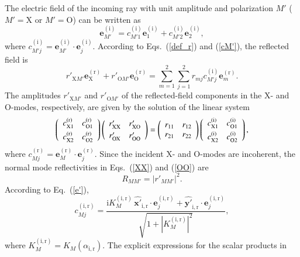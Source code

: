 \documentclass{aa}
\newcommand{\beq}{\begin{equation}}
\newcommand{\eeq}{\end{equation}}
\newcommand{\req}[1]{Eq.~(\ref{#1})}
\begin{document}
The electric field
of the incoming ray with unit amplitude and polarization
$M'$ ($M'=$X or $M'=$O) can be written as
\beq
  \bm{e}^\mathrm{(i)}_{M'} = 
     c_{M'1}^\mathrm{(i)} \bm{e}_1^\mathrm{(i)}
      + c_{M'2}^\mathrm{(i)} \bm{e}_2^\mathrm{(i)},
\label{cM'}
\eeq
where $c_{M'j}^\mathrm{(i)} = \bm{e}_{M'}^\mathrm{(i)}
\cdot \bm{e}_j^\mathrm{(i)}$.
According to Eqs.~(\ref{def_r}) and (\ref{cM'}), the
reflected field is 
\beq
   r'_{\mathrm{X}M'} \bm{e_\mathrm{X}^\mathrm{(r)}}
   + r'_{\mathrm{O}M'} \bm{e_\mathrm{O}^\mathrm{(r)}}
   =
   \sum_{m=1}^{2} \sum_{j=1}^{2} r_{mj} 
      c_{M'j}^\mathrm{(i)} \bm{e}_m^\mathrm{(r)} .
\eeq
The amplitudes $r'_{\mathrm{X}M'}$ and
 $r'_{\mathrm{O}M'}$ of the reflected-field components in
the X- and O-modes, respectively, are given by the solution
of the linear system
\beq
   \left( \begin{array}{cc}
      c_\mathrm{X1}^\mathrm{(r)}  & c_\mathrm{O1}^\mathrm{(r)}
 \\
\rule{0pt}{3ex}
      c_\mathrm{X2}^\mathrm{(r)}  & c_\mathrm{O2}^\mathrm{(r)}
    \end{array} \right)
   \left( \begin{array}{cc}
        r'_{\mathrm{XX}} & r'_{\mathrm{XO}} 
 \\
\rule{0pt}{2.5ex}
 r'_{\mathrm{OX}} & r'_{\mathrm{OO}}
    \end{array} \right)
       =
   \left( \begin{array}{cc}
      r_{11} & r_{12} \\
      r_{21} & r_{22}
    \end{array} \right)
   \left( \begin{array}{cc}
      c_\mathrm{X1}^\mathrm{(i)}  & c_\mathrm{O1}^\mathrm{(i)}
 \\
\rule{0pt}{3ex}
      c_\mathrm{X2}^\mathrm{(i)}  & c_\mathrm{O2}^\mathrm{(i)}
    \end{array} \right)
     ,
\label{r'MM'}
\eeq
where $c_{Mj}^\mathrm{(r)} = \bm{e}_{M}^\mathrm{(r)}
\cdot \bm{e}_j^\mathrm{(r)}$. Since
the incident X- and O-modes are incoherent,
the normal mode
reflectivities in Eqs.~(\ref{XX}) and (\ref{OO}) are
\beq
   R_{MM'} = | r'_{MM'} |^2.
\eeq
According to \req{e'},
\beq
   c_{Mj}^\mathrm{(i,r)} =
      \frac{\mathrm{i}K_M^\mathrm{(i,r)}
        \,\hat{\mathbf{x'}}_\mathrm{i,r}\cdot\bm{e}_j^\mathrm{(i,r)}
         + \hat{\mathbf{y'}}_\mathrm{i,r}\cdot\bm{e}_j^\mathrm{(i,r)}
         }{
         \sqrt{1+|K_M^\mathrm{(i,r)}|^2}} ,
\label{cMj}
\eeq
where $K_M^\mathrm{(i,r)}=K_M(\alpha_\mathrm{i,r})$.
The explicit expressions for the scalar products in
\end{document}
